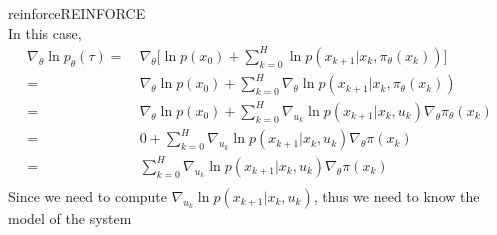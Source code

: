 \documentclass[9pt]{article}
\begin{document}
\begin{topic}{reinforce}{REINFORCE}
\[\]
In this case, 
\[
\begin{split}
\nabla_{\theta} \ln p_{\theta}(\tau) = &\ \nabla_{\theta} \big[ \ln p(x_0) + \sum_{k=0}^{H} \ln p(x_{k+1}|x_k,\pi_{\theta}(x_k))\big]\\
= &\ \nabla_{\theta} \ln p(x_0) + \sum_{k=0}^{H} \nabla_{\theta} \ln p(x_{k+1}|x_k,\pi_{\theta}(x_k))\\
= &\ \nabla_{\theta} \ln p(x_0) + \sum_{k=0}^{H} \nabla_{u_k} \ln p(x_{k+1}|x_k,u_k) \nabla_{\theta} \pi_{\theta}(x_k)\\
= &\ 0 +  \sum_{k=0}^{H} \nabla_{u_k} \ln p(x_{k+1}|x_k,u_k) \nabla_{\theta} \pi(x_k)\\
= &\ \sum_{k=0}^{H} \nabla_{u_k} \ln p(x_{k+1}|x_k,u_k) \nabla_{\theta} \pi(x_k)\\
\end{split}
\]
Since we need to compute $\nabla_{u_k} \ln p(x_{k+1}|x_k,u_k)$, thus we need to know the model of the system
\end{topic}
\end{document}

